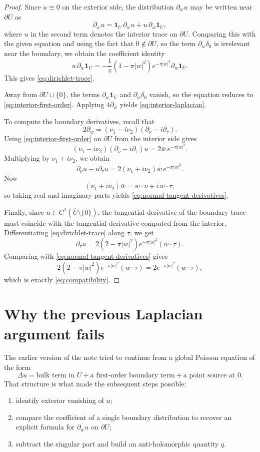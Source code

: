 \documentclass[11pt]{article}
\newcommand{\1}{\mathbf 1}
\newcommand{\pw}{\partial_w}
\newcommand{\pwb}{\partial_{\bar w}}
\begin{document}
\begin{proof}
Since \(u\equiv 0\) on the exterior side, the distribution \(\pw u\) may be written near
\(\partial U\) as
\[
\pw u
=
\1_U\,\pw u + u\,\pw \1_U,
\]
where \(u\) in the second term denotes the interior trace on \(\partial U\).
Comparing this with the given equation and using the fact that \(0\notin \partial U\), so the
term \(\pw\delta_0\) is irrelevant near the boundary, we obtain the coefficient identity
\[
u\,\pw \1_U
=
-\frac1\pi(1-\pi|w|^2)e^{-\pi|w|^2}\pw \1_U.
\]
This gives \eqref{eq:dirichlet-trace}.

Away from \(\partial U\cup\{0\}\), the terms \(\pw \1_U\) and \(\pw\delta_0\) vanish, so the
equation reduces to \eqref{eq:interior-first-order}. Applying \(4\pwb\) yields
\eqref{eq:interior-laplacian}.

To compute the boundary derivatives, recall that
\[
2\pw
=
(\nu_1-i\nu_2)(\partial_\nu-i\partial_\tau).
\]
Using \eqref{eq:interior-first-order} on \(\partial U\) from the interior side gives
\[
(\nu_1-i\nu_2)(\partial_\nu-i\partial_\tau)u
=
2\bar w\,e^{-\pi|w|^2}.
\]
Multiplying by \(\nu_1+i\nu_2\), we obtain
\[
\partial_\nu u-i\partial_\tau u
=
2(\nu_1+i\nu_2)\bar w\,e^{-\pi|w|^2}.
\]
Now
\[
(\nu_1+i\nu_2)\bar w=w\cdot \nu+i\,w\cdot \tau,
\]
so taking real and imaginary parts yields \eqref{eq:normal-tangent-derivatives}.

Finally, since \(u\in C^1(\overline U\setminus\{0\})\), the tangential derivative of the
boundary trace must coincide with the tangential derivative computed from the interior. Differentiating
\eqref{eq:dirichlet-trace} along \(\tau\), we get
\[
\partial_\tau u
=
2(2-\pi|w|^2)e^{-\pi|w|^2}(w\cdot \tau).
\]
Comparing with \eqref{eq:normal-tangent-derivatives} gives
\[
2(2-\pi|w|^2)e^{-\pi|w|^2}(w\cdot \tau)
=
2e^{-\pi|w|^2}(w\cdot \tau),
\]
which is exactly \eqref{eq:compatibility}.
\end{proof}

\section{Why the previous Laplacian argument fails}

The earlier version of the note tried to continue from a global Poisson equation of the form
\[
\Delta u
=
\text{bulk term in }U
+\text{a first-order boundary term}
+\text{a point source at }0.
\]
That structure is what made the subsequent steps possible:
\begin{enumerate}[label=\textnormal{(\arabic*)}]
\item identify exterior vanishing of \(u\);
\item compare the coefficient of a single boundary distribution to recover an explicit
formula for \(\pwb u\) on \(\partial U\);
\item subtract the singular part and build an anti-holomorphic quantity \(q\).
\end{enumerate}
\end{document}
